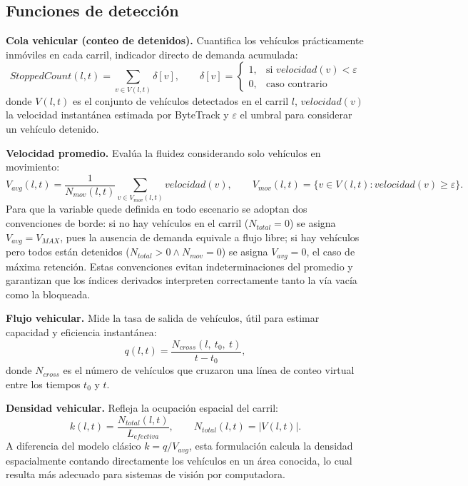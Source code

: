 \subsection{Funciones de detección}\label{subsec:funciones-deteccion}

\textbf{Cola vehicular (conteo de detenidos).} Cuantifica los vehículos prácticamente
inmóviles en cada carril, indicador directo de demanda acumulada:
\[
StoppedCount(l,t) = \sum_{v \in V(l,t)}\delta[v],
\qquad
\delta[v] =
\begin{cases}
1, & \text{si } velocidad(v) < \varepsilon\\[2pt]
0, & \text{caso contrario}
\end{cases}
\]
donde $V(l,t)$ es el conjunto de vehículos detectados en el carril $l$, $velocidad(v)$ la
velocidad instantánea estimada por ByteTrack y $\varepsilon$ el umbral para considerar un
vehículo detenido.

\textbf{Velocidad promedio.} Evalúa la fluidez considerando solo vehículos en movimiento:
\[
V_{avg}(l,t) = \frac{1}{N_{mov}(l,t)}\sum_{v \in V_{mov}(l,t)}velocidad(v),
\qquad
V_{mov}(l,t) = \{ v \in V(l,t): velocidad(v) \geq \varepsilon\}.
\]
Para que la variable quede definida en todo escenario se adoptan dos convenciones de borde: si
no hay vehículos en el carril ($N_{total}=0$) se asigna $V_{avg}=V_{MAX}$, pues la ausencia de
demanda equivale a flujo libre; si hay vehículos pero todos están detenidos
($N_{total}>0 \land N_{mov}=0$) se asigna $V_{avg}=0$, el caso de máxima retención. Estas
convenciones evitan indeterminaciones del promedio y garantizan que los índices derivados
interpreten correctamente tanto la vía vacía como la bloqueada.

\textbf{Flujo vehicular.} Mide la tasa de salida de vehículos, útil para estimar capacidad y
eficiencia instantánea:
\[
q(l,t) = \frac{N_{cross}(l,\ t_{0},\ t)}{t-t_{0}},
\]
donde $N_{cross}$ es el número de vehículos que cruzaron una línea de conteo virtual entre los
tiempos $t_{0}$ y $t$.

\textbf{Densidad vehicular.} Refleja la ocupación espacial del carril:
\[
k(l,t) = \frac{N_{total}(l,t)}{L_{efectiva}},
\qquad N_{total}(l,t)=|V(l,t)|.
\]
A diferencia del modelo clásico $k=q/V_{avg}$, esta formulación calcula la densidad
espacialmente contando directamente los vehículos en un área conocida, lo cual resulta más
adecuado para sistemas de visión por computadora.

